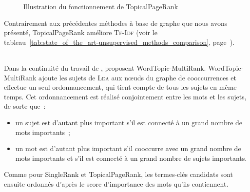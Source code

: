 \begin{figure}[t]
          \caption{Illustration du fonctionnement de TopicalPageRank~\cite{liu2010topicalpagerank}
                   \label{fig:topicalpagerank}}
        \end{figure}

        Contrairement aux précédentes méthodes à base de graphe que nous avons
        présenté, TopicalPageRank améliore \textsc{Tf-Idf} (voir le
        tableau~\ref{tab:state_of_the_art-unsupervised_methods_comparison},
        page~\pageref{tab:state_of_the_art-unsupervised_methods_comparison}).

        ~\\Dans la continuité du travail de ,
         proposent WordTopic-MultiRank.
        WordTopic-MultiRank ajoute les sujets de \textsc{Lda} aux n\oe{}uds du
        graphe de cooccurrences et effectue un seul ordonnancement, qui tient
        compte de tous les sujets en même temps. Cet ordonnancement est réalisé
        conjointement entre les mots et les sujets, de sorte que~:
        \begin{itemize}
          \item{un sujet est d'autant plus important s'il est connecté à un
                grand nombre de mots importants~;}
          \item{un mot est d'autant plus important s'il cooccurre avec un grand
                nombre de mots importants et s'il est connecté à un grand nombre
                de sujets importants.}
        \end{itemize}
        Comme pour SingleRank et TopicalPageRank, les termes-clés candidats sont
        ensuite ordonnés d'après le score d'importance des mots qu'ils
        contiennent.

